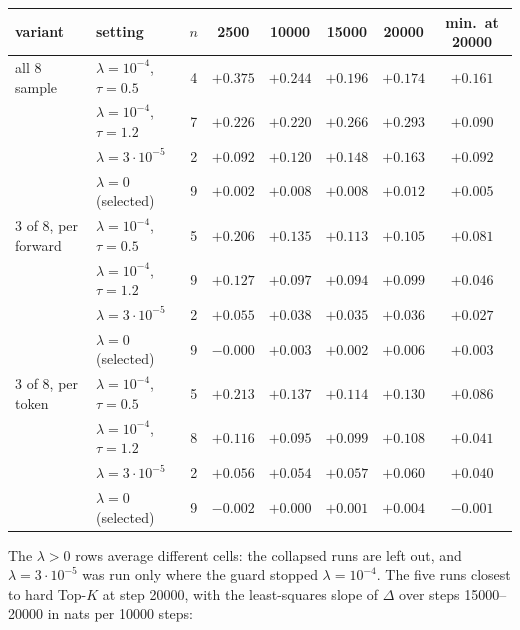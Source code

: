 \documentclass[11pt,a4paper]{article}
\begin{document}
\begin{center}
\small
\begin{tabular}{llcccccc}
\toprule
variant & setting & $n$ & 2500 & 10000 & 15000 & 20000 & min.\ at 20000 \\
\midrule
all 8 sample        & $\lambda = 10^{-4}$, $\tau = 0.5$     & 4 & $+0.375$ & $+0.244$ & $+0.196$ & $+0.174$ & $+0.161$ \\
                    & $\lambda = 10^{-4}$, $\tau = 1.2$     & 7 & $+0.226$ & $+0.220$ & $+0.266$ & $+0.293$ & $+0.090$ \\
                    & $\lambda = 3\cdot10^{-5}$             & 2 & $+0.092$ & $+0.120$ & $+0.148$ & $+0.163$ & $+0.092$ \\
                    & $\lambda = 0$ (selected)              & 9 & $+0.002$ & $+0.008$ & $+0.008$ & $+0.012$ & $+0.005$ \\
\midrule
3 of 8, per forward & $\lambda = 10^{-4}$, $\tau = 0.5$     & 5 & $+0.206$ & $+0.135$ & $+0.113$ & $+0.105$ & $+0.081$ \\
                    & $\lambda = 10^{-4}$, $\tau = 1.2$     & 9 & $+0.127$ & $+0.097$ & $+0.094$ & $+0.099$ & $+0.046$ \\
                    & $\lambda = 3\cdot10^{-5}$             & 2 & $+0.055$ & $+0.038$ & $+0.035$ & $+0.036$ & $+0.027$ \\
                    & $\lambda = 0$ (selected)              & 9 & $-0.000$ & $+0.003$ & $+0.002$ & $+0.006$ & $+0.003$ \\
\midrule
3 of 8, per token   & $\lambda = 10^{-4}$, $\tau = 0.5$     & 5 & $+0.213$ & $+0.137$ & $+0.114$ & $+0.130$ & $+0.086$ \\
                    & $\lambda = 10^{-4}$, $\tau = 1.2$     & 8 & $+0.116$ & $+0.095$ & $+0.099$ & $+0.108$ & $+0.041$ \\
                    & $\lambda = 3\cdot10^{-5}$             & 2 & $+0.056$ & $+0.054$ & $+0.057$ & $+0.060$ & $+0.040$ \\
                    & $\lambda = 0$ (selected)              & 9 & $-0.002$ & $+0.000$ & $+0.001$ & $+0.004$ & $-0.001$ \\
\bottomrule
\end{tabular}
\end{center}

The $\lambda > 0$ rows average different cells: the collapsed runs are left out,
and $\lambda = 3\cdot10^{-5}$ was run only where the guard stopped
$\lambda = 10^{-4}$. The five runs closest to hard Top-$K$ at step 20000, with
the least-squares slope of $\Delta$ over steps 15000--20000 in nats per 10000
steps:
\end{document}
